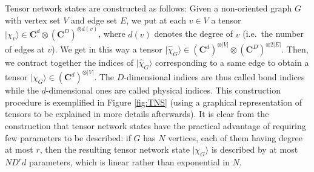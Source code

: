 \documentclass{amsart}
\newcommand{\C}{\mathbf{C}}
\newcommand{\ket}[1]{| #1 \rangle}
\begin{document}
Tensor network states are constructed as follows: Given a non-oriented graph $G$ with vertex set $V$ and edge set $E$, we put at each $v\in V$ a tensor $\ket{\chi_v}\in\C^d\otimes(\C^D)^{\otimes d(v)}$, where $d(v)$ denotes the degree of $v$ (i.e.~the number of edges at $v$). We get in this way a tensor $\ket{\hat{\chi}_G}\in (\C^d)^{\otimes |V|}\otimes(\C^D)^{\otimes 2|E|}$. Then, we contract together the indices of $\ket{\hat{\chi}_G}$ corresponding to a same edge to obtain a tensor $\ket{\chi_G}\in(\C^d)^{\otimes |V|}$. The $D$-dimensional indices are thus called bond indices while the $d$-dimensional ones are called physical indices. This construction procedure is exemplified in Figure \ref{fig:TNS} (using a graphical representation of tensors to be explained in more details afterwards). It is clear from the construction that tensor network states have the practical advantage of requiring few parameters to be described: if $G$ has $N$ vertices, each of them having degree at most $r$, then the resulting tensor network state $\ket{\chi_G}$ is described by at most $ND^rd$ parameters, which is linear rather than exponential in $N$.
\end{document}
